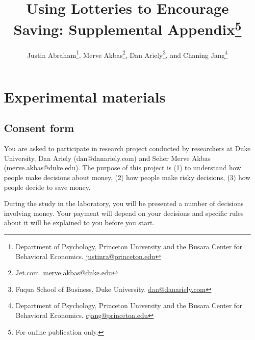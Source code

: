 \documentclass[11pt]{article}
\begin{document}
\title{Using Lotteries to Encourage Saving: Supplemental Appendix\thanks{For online publication only.}}

\author{Justin Abraham\thanks{Department of Psychology, Princeton University and the Busara Center for Behavioral Economics. \protect\href{mailto:justinra@princeton.edu}{justinra@princeton.edu}}, Merve Akbas\thanks{Jet.com. \protect\href{mailto:merve.akbas@duke.edu}{merve.akbas@duke.edu}}, Dan Ariely\thanks{Fuqua School of Business, Duke University. \protect\href{mailto:dan@danariely.com}{dan@danariely.com}}, and Chaning Jang\thanks{Department of Psychology, Princeton University and the Busara Center for Behavioral Economics. \protect\href{mailto:cjang@princeton.edu}{cjang@princeton.edu}}} %

\maketitle

\newpage

\tableofcontents

\newpage

\appendix

\section{Experimental materials}


    \subsection{Consent form}

        \noindent You are asked to participate in research project conducted by researchers at Duke University, Dan Ariely (dan@danariely.com) and Seher Merve Akbas (merve.akbas@duke.edu). The purpose of this project is (1) to understand how people make decisions about money, (2) how people make risky decisions, (3) how people decide to save money.

        \vspace{5mm}

        \noindent During the study in the laboratory, you will be presented a number of decisions involving money. Your payment will depend on your decisions and specific rules about it will be explained to you before you start.

        \vspace{5mm}
\end{document}
